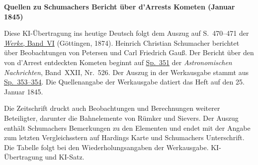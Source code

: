 \clearpage\thispagestyle{empty}
\begin{center}\textbf{Quellen zu Schumachers Bericht über d’Arrests Kometen (Januar 1845)}\end{center}
\noindent Diese KI-Übertragung ins heutige Deutsch folgt dem Auszug auf S.~470--471 der \href{https://gdz.sub.uni-goettingen.de/id/PPN236007467}{\textit{Werke}, Band~VI} (Göttingen, 1874). Heinrich Christian Schumacher berichtet über Beobachtungen von Petersen und Carl Friedrich Gauß. Der Bericht über den von d’Arrest entdeckten Kometen beginnt auf \href{https://api.digitale-sammlungen.de/iiif/image/v2/bsb10049447_00184/full/1800,/0/default.jpg}{Sp.~351} der \textit{Astronomischen Nachrichten}, Band~XXII, Nr.~526. Der Auszug in der Werkausgabe stammt aus \href{https://api.digitale-sammlungen.de/iiif/image/v2/bsb10049447_00185/full/1800,/0/default.jpg}{Sp.~353--354}. Die Quellenangabe der Werkausgabe datiert das Heft auf den 25. Januar 1845.
\par\smallskip\noindent Die Zeitschrift druckt auch Beobachtungen und Berechnungen weiterer Beteiligter, darunter die Bahnelemente von Rümker und Sievers. Der Auszug enthält Schumachers Bemerkungen zu den Elementen und endet mit der Angabe zum letzten Vergleichsstern auf Hardings Karte und Schumachers Unterschrift. Die Tabelle folgt bei den Wiederholungsangaben der Werkausgabe. KI-Übertragung und KI-Satz.
\clearpage
